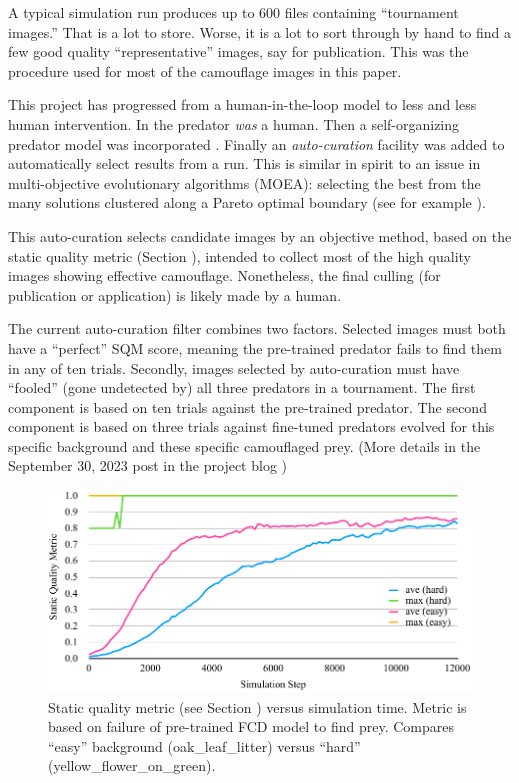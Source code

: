 \documentclass[letterpaper]{article}
\newcommand{\jargon}[1]{\textit{#1}}
\newcommand{\runID}{\footnotesize}
\begin{document}
A typical simulation run produces up to 600 files containing ``tournament images.'' That is a lot to store. Worse, it is a lot to sort through by hand to find a few good quality ``representative'' images, say for publication. This was the procedure used for most of the camouflage images in this paper.
\par
This project has progressed from a human-in-the-loop model to less and less human intervention. In \citet{reynolds_iec_2011} the predator \textit{was} a human. Then a self-organizing predator model was incorporated \citep{reynolds_coevolution_2023}. Finally an \jargon{auto-curation} facility was added to automatically select results from a run. This is similar in spirit to an issue in multi-objective evolutionary algorithms (MOEA): selecting the best from the many solutions clustered along a Pareto optimal boundary (see for example \citet{ishibuchi_difficulties_2022}).
\par
This auto-curation selects candidate images by an objective method, based on the static quality metric (Section ), intended to collect most of the high quality images showing effective camouflage. Nonetheless, the final culling (for publication or application) is likely made by a human.
\par
The current auto-curation filter combines two factors. Selected images must both have a ``perfect'' SQM score, meaning the pre-trained predator fails to find them in any of ten trials. Secondly, images selected by auto-curation must have ``fooled'' (gone undetected by) all three predators in a tournament. The first component is based on ten trials against the pre-trained predator. The second component is based on three trials against fine-tuned predators evolved for this specific background and these specific camouflaged prey. (More details in the September 30, 2023 post in the project blog \citep{reynolds_texsyn_blog_2023})
\par


\begin{figure}[t]
    \includegraphics[width=\columnwidth]{SQM_plot_easy_vs_hard.pdf}
    \caption{Static quality metric (see Section ) versus simulation time. Metric is based on failure of pre-trained FCD model to find prey. Compares ``easy'' background ({\runID oak\_leaf\_litter}) versus ``hard'' ({\runID yellow\_flower\_on\_green}).}
    \label{fig:sqm_plot}
\end{figure}
\end{document}
